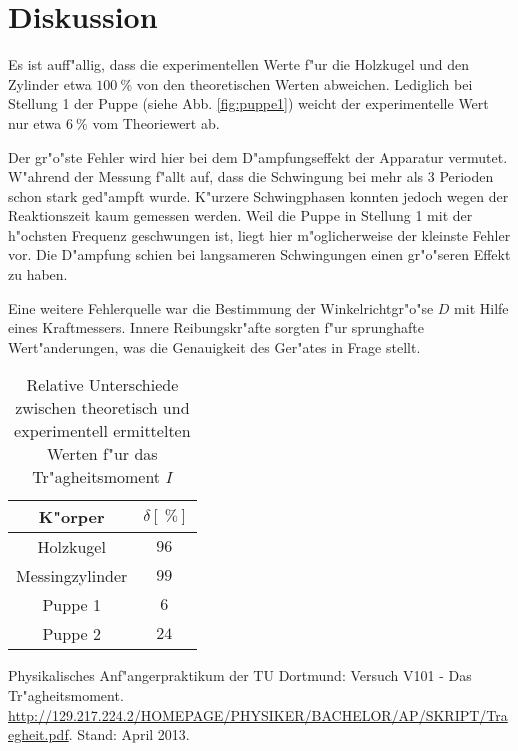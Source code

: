 \section{Diskussion}
\label{diskussion}
Es ist auff"allig, dass die experimentellen Werte f"ur die Holzkugel und den Zylinder etwa $\SI{100}{\percent}$ von den theoretischen Werten abweichen.
Lediglich bei Stellung 1 der Puppe (siehe Abb. \ref{fig:puppe1}) weicht der experimentelle Wert nur etwa $\SI{6}{\percent}$ vom Theoriewert ab.

Der gr"o"ste Fehler wird hier bei dem D"ampfungseffekt der Apparatur vermutet.
W"ahrend der Messung f"allt auf, dass die Schwingung bei mehr als 3 Perioden schon stark ged"ampft wurde.
K"urzere Schwingphasen konnten jedoch wegen der Reaktionszeit kaum gemessen werden.
Weil die Puppe in Stellung 1 mit der h"ochsten Frequenz geschwungen ist, liegt hier m"oglicherweise der kleinste Fehler vor.
Die D"ampfung schien bei langsameren Schwingungen einen gr"o"seren Effekt zu haben.

Eine weitere Fehlerquelle war die Bestimmung der Winkelrichtgr"o"se $D$ mit Hilfe eines Kraftmessers.
Innere Reibungskr"afte sorgten f"ur sprunghafte Wert"anderungen, was die Genauigkeit des Ger"ates in Frage stellt.

\begin{table}[h!]
	\begin{center}
		\caption{Relative Unterschiede zwischen theoretisch und experimentell ermittelten Werten f"ur das Tr"agheitsmoment $I$\label{tabelle:unterschiede}}
		\begin{tabular}{|c||c|}
			\hline
			K"orper & $\delta [\SI{}{\percent}]$ \\
			\hline 
			\hline
			Holzkugel & $\SI{96}{}$ \\
			Messingzylinder & $\SI{99}{}$ \\
			Puppe 1 & $\SI{6}{}$ \\
			Puppe 2 & $\SI{24}{}$ \\
			\hline 
		\end{tabular}
	\end{center}
\end{table}
	

\begin{thebibliography}{9}
	 Physikalisches Anf"angerpraktikum der TU Dortmund: Versuch V101 - Das Tr"agheitsmoment. \url{http://129.217.224.2/HOMEPAGE/PHYSIKER/BACHELOR/AP/SKRIPT/Traegheit.pdf}. Stand: April 2013.
\end{thebibliography}
